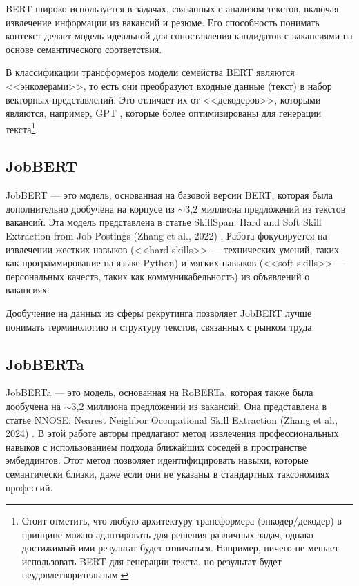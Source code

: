 \documentclass[14pt]{mmcs_article}
\begin{document}
BERT широко используется в задачах, связанных с анализом текстов, включая извлечение информации из вакансий и резюме. Его способность понимать контекст делает модель идеальной для сопоставления кандидатов с вакансиями на основе семантического соответствия.

В классификации трансформеров модели семейства BERT являются <<энкодерами>>, то есть они преобразуют входные данные (текст) в набор векторных представлений. Это отличает их от <<декодеров>>, которыми являются, например, GPT \cite{radford2018improving}, которые более оптимизированы для генерации текста\footnote{Стоит отметить, что любую архитектуру трансформера (энкодер/декодер) в принципе можно адаптировать для решения различных задач, однако достижимый ими результат будет отличаться. Например, ничего не мешает использовать BERT для генерации текста, но результат будет неудовлетворительным.}.

\subsection*{JobBERT}\label{jobbert}

JobBERT --- это модель, основанная на базовой версии BERT, которая была дополнительно дообучена на корпусе из $\sim$3,2 миллиона предложений из текстов вакансий. Эта модель представлена в статье SkillSpan: Hard and Soft Skill Extraction from Job Postings (Zhang et al., 2022) \cite{zhang-etal-2022-skillspan}. Работа фокусируется на извлечении жестких навыков (<<hard skills>> --- технических умений, таких как программирование на языке Python) и мягких навыков (<<soft skills>> --- персональных качеств, таких как коммуникабельность) из объявлений о вакансиях.

Дообучение на данных из сферы рекрутинга позволяет JobBERT лучше понимать терминологию и структуру текстов, связанных с рынком труда. \cite{yacenko2023}

\subsection*{JobBERTa}\label{jobberta}

JobBERTa --- это модель, основанная на RoBERTa, которая также была дообучена на $\sim$3,2 миллиона предложений из вакансий. Она представлена в статье NNOSE: Nearest Neighbor Occupational Skill Extraction (Zhang et al., 2024) \cite{zhang-etal-2024-nnose}. В этой работе авторы предлагают метод извлечения профессиональных навыков с использованием подхода ближайших соседей в пространстве эмбеддингов. Этот метод позволяет идентифицировать навыки, которые семантически близки, даже если они не указаны в стандартных таксономиях профессий.
\end{document}
